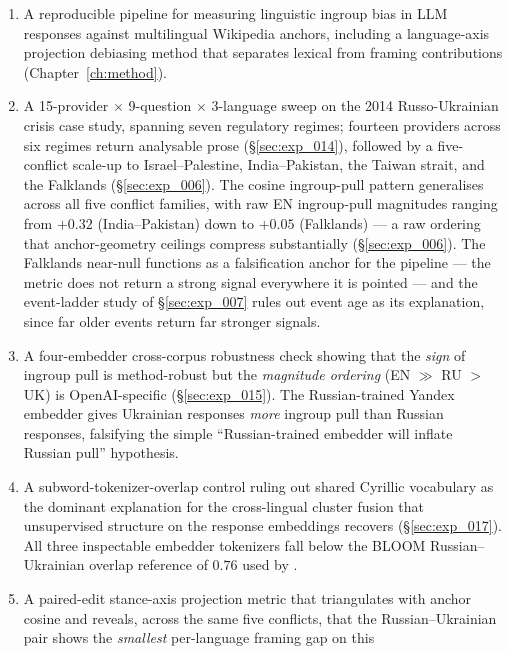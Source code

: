 \begin{enumerate}
  \item A reproducible pipeline for measuring linguistic
    ingroup bias in LLM responses against multilingual
    Wikipedia anchors, including a language-axis projection
    debiasing method that separates lexical from framing
    contributions (Chapter~\ref{ch:method}).
  \item A 15-provider $\times$ 9-question $\times$
    3-language sweep on the 2014 Russo-Ukrainian crisis case
    study, spanning seven regulatory regimes; fourteen providers
    across six regimes return analysable prose
    (\S\ref{sec:exp_014}), followed by a five-conflict
    scale-up to Israel--Palestine, India--Pakistan, the Taiwan
    strait, and the Falklands (\S\ref{sec:exp_006}). The
    cosine ingroup-pull pattern generalises across all five
    conflict families, with raw EN ingroup-pull magnitudes
    ranging from ${+}0.32$ (India--Pakistan) down to ${+}0.05$
    (Falklands) --- a raw ordering that anchor-geometry ceilings
    compress substantially (\S\ref{sec:exp_006}). The Falklands near-null functions as a
    falsification anchor for the pipeline --- the metric does not
    return a strong signal everywhere it is pointed --- and the
    event-ladder study of \S\ref{sec:exp_007} rules out event age
    as its explanation, since far older events return far stronger
    signals.
  \item A four-embedder cross-corpus robustness check showing
    that the \emph{sign} of ingroup pull is method-robust but
    the \emph{magnitude ordering} (EN ${\gg}$ RU ${>}$ UK) is
    OpenAI-specific (\S\ref{sec:exp_015}). The Russian-trained
    Yandex embedder gives Ukrainian responses \emph{more}
    ingroup pull than Russian responses, falsifying the simple
    ``Russian-trained embedder will inflate Russian pull''
    hypothesis.
  \item A subword-tokenizer-overlap control ruling out shared
    Cyrillic vocabulary as the dominant explanation for the
    cross-lingual cluster fusion that unsupervised structure
    on the response embeddings recovers
    (\S\ref{sec:exp_017}). All three inspectable embedder
    tokenizers fall below the BLOOM Russian--Ukrainian overlap
    reference of $0.76$ used by \citet{qi2023crosslingual}.
  \item A paired-edit stance-axis projection metric that
    triangulates with anchor cosine and reveals, across the
    same five conflicts, that the Russian--Ukrainian pair shows
    the \emph{smallest} per-language framing gap on this

\end{enumerate}

